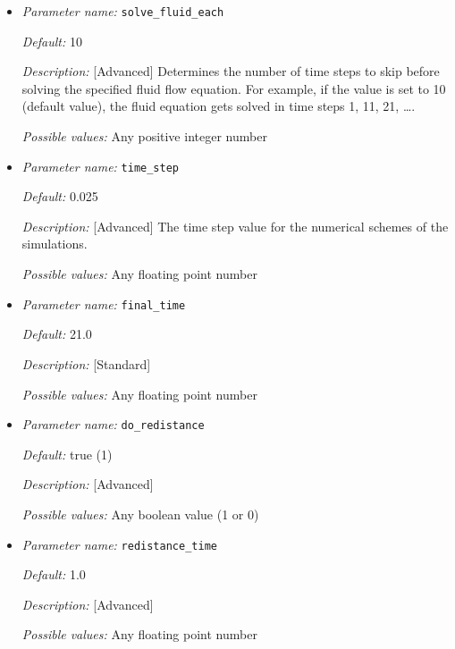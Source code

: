 \begin{itemize}
{\it Possible values:} Any boolean value (1 or 0)


\item {\it Parameter name:} {\tt solve\_fluid\_each}
\label{parameters:solve_fluid_each}


{\it Default:} 10

{\it Description:} [Advanced] Determines the number of time steps to skip before solving the specified fluid flow equation. For example, if the value is set to 10 (default value), the fluid equation gets solved in time steps 1, 11, 21, \ldots.

{\it Possible values:} Any positive integer number


\item {\it Parameter name:} {\tt time\_step}
\label{parameters:time_step}


{\it Default:} 0.025

{\it Description:} [Advanced] The time step value for the numerical schemes of the simulations.

{\it Possible values:} Any floating point number


\item {\it Parameter name:} {\tt final\_time}
\label{parameters:final_time}


{\it Default:} 21.0

{\it Description:} [Standard] 

{\it Possible values:} Any floating point number


\item {\it Parameter name:} {\tt do\_redistance}
\label{parameters:do_redistance}


{\it Default:} true (1)

{\it Description:} [Advanced] 

{\it Possible values:} Any boolean value (1 or 0)


\item {\it Parameter name:} {\tt redistance\_time}
\label{parameters:redistance_time}


{\it Default:} 1.0

{\it Description:} [Advanced] 

{\it Possible values:} Any floating point number

\end{itemize}


